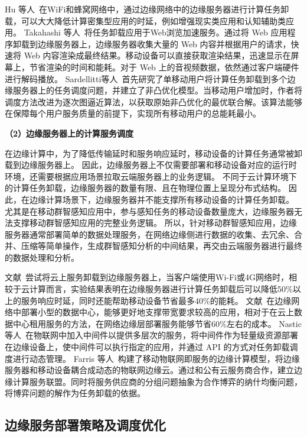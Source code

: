 Hu 等人~\cite{DBLP:conf/apsys/HuGHWACPS16}在WiFi和蜂窝网络中，通过边缘网络中的边缘服务器进行计算任务卸载，可以大大降低计算密集型应用的时延，例如增强现实类应用和认知辅助类应用。
Takahashi 等人~\cite{DBLP:conf/mobilecloud/TakahashiTK15}将任务卸载应用于Web浏览加速服务。通过将 Web 应用程序卸载到边缘服务器上，边缘服务器收集大量的 Web 内容并根据用户的请求，快速将 Web 内容渲染成最终结果。移动设备可以直接获取渲染结果，迅速显示在屏幕上，节省渲染的时间和能耗。对于 Web 上的音视频数据，依然通过客户端硬件进行解码播放。
Sardellitti等人~\cite{DBLP:journals/tsipn/SardellittiSB15}首先研究了单移动用户将计算任务卸载到多个边缘服务器上的任务调度问题，并建立了非凸优化模型。当移动用户增加时，作者将调度方法改进为逐次图逼近算法，以获取原始非凸优化的最优联合解。该算法能够在保障每个用户服务质量的前提下，实现所有移动用户的总能耗最小。

\textbf{（2）边缘服务器上的计算服务调度}

在边缘计算中，为了降低传输延时和服务响应延时，移动设备的计算任务通常被卸载到边缘服务器上。
因此，边缘服务器上不仅需要部署和移动设备对应的运行时环境，还需要根据应用场景拉取云端服务器上的业务逻辑。
不同于云计算环境下的计算任务卸载，边缘服务器的数量有限、且在物理位置上呈现分布式结构。
因此，在边缘计算场景下，边缘服务器并不能支撑所有移动设备的计算任务卸载。
尤其是在移动群智感知应用中，参与感知任务的移动设备数量庞大，边缘服务器无法支撑移动群智感知应用的完整业务逻辑。
所以，针对移动群智感知应用，边缘服务器通常部署简单的数据处理服务，在网络边缘侧进行数据的收集、去冗余、合并、压缩等简单操作，生成群智感知分析的中间结果，再交由云端服务器进行最终的数据处理和分析。

文献~尝试将云上服务卸载到边缘服务器上，当客户端使用Wi-Fi或4G网络时，相较于云计算而言，实验结果表明在边缘服务器进行计算任务卸载后可以降低50\%以上的服务响应时延，同时还能帮助移动设备节省最多40\%的能耗。
文献~在边缘网络中部署小型的数据中心，能够更好地支撑带宽要求较高的应用，相对于在云上数据中心租用服务的方法，在网络边缘层部署服务能够节省60\%左右的成本。
Nastic等人~\cite{DBLP:conf/edge/NasticTD16}在物联网中加入中间件以提供多层次的服务，将中间件作为轻量级资源部署在边缘设备上，使中间件可以执行指定的应用，并通过 API 的方式对任务卸载调度进行动态管理。
Farris 等人~\cite{DBLP:journals/fgcs/FarrisMNAI17}构建了移动物联网即服务的边缘计算模型，将边缘服务器和移动设备耦合成动态的物联网边缘云。通过和公有云服务商合作，建立边缘计算服务联盟。同时将服务供应商的分组问题抽象为合作博弈的纳什均衡问题，将博弈问题的解作为任务卸载的依据。

\subsection{边缘服务部署策略及调度优化}

